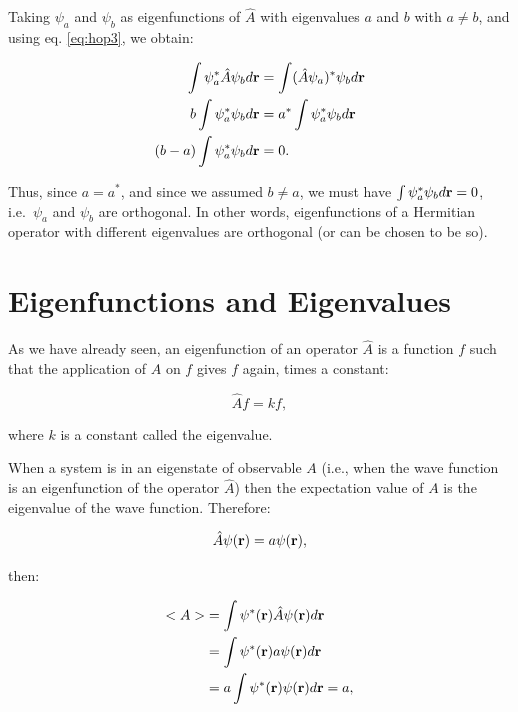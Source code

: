 \documentclass[
  9pt,
]{extbook}
\theoremstyle{definition}
\theoremstyle{definition}
\theoremstyle{definition}
\theoremstyle{remark}
\begin{document}
Taking \(\psi_a\) and \(\psi_b\) as eigenfunctions of \(\hat{A}\) with eigenvalues \(a\) and \(b\) with \(a \neq b\), and using eq. \eqref{eq:hop3}, we obtain:

\begin{equation}
\begin{aligned}
\int \psi_a^{*} \hat{A} \psi_b d{\bf r} &= \int (\hat{A} \psi_a)^{*} \psi_b d{\bf r}\\
b \int \psi_a^{*} \psi_b d{\bf r}   &= a^{*} \int \psi_a^{*} \psi_b d{\bf r}\\
(b - a) \int \psi_a^{*} \psi_b d{\bf r} &= 0.
\end{aligned}
\label{eq:hop5}
\end{equation}

Thus, since \(a = a^{*}\), and since we assumed \(b \neq a\), we must have \(\int \psi_a^{*} \psi_b d{\bf r} = 0\), i.e.~\(\psi_a\) and \(\psi_b\) are orthogonal. In other words, eigenfunctions of a Hermitian operator with different eigenvalues are orthogonal (or can be chosen to be so).

\hypertarget{eigenfunctions-and-eigenvalues}{%
\section{Eigenfunctions and Eigenvalues}\label{eigenfunctions-and-eigenvalues}}

As we have already seen, an eigenfunction of an operator \(\hat{A}\) is a function \(f\) such that the application of \(\hat{A}\) on \(f\) gives \(f\) again, times a constant:

\begin{equation}
\hat{A} f = k f,
\label{eq:ee1}
\end{equation}

where \(k\) is a constant called the eigenvalue.

When a system is in an eigenstate of observable \(A\) (i.e., when the wave function is an eigenfunction of the operator \(\hat{A}\)) then the expectation value of \(A\) is the eigenvalue of the wave function. Therefore:

\begin{equation}
\hat{A} \psi({\bf r}) = a \psi({\bf r}),
\label{eq:ee2}
\end{equation}

then:

\begin{equation}
\begin{aligned}
<A> &= \int \psi^{*}({\bf r}) \hat{A} \psi({\bf r}) d{\bf r} \\
&= \int \psi^{*}({\bf r}) a \psi({\bf r}) d{\bf r} \\    
&= a \int \psi^{*}({\bf r}) \psi({\bf r}) d{\bf r} = a,  
\end{aligned}
\label{eq:ee3}
\end{equation}
\end{document}
